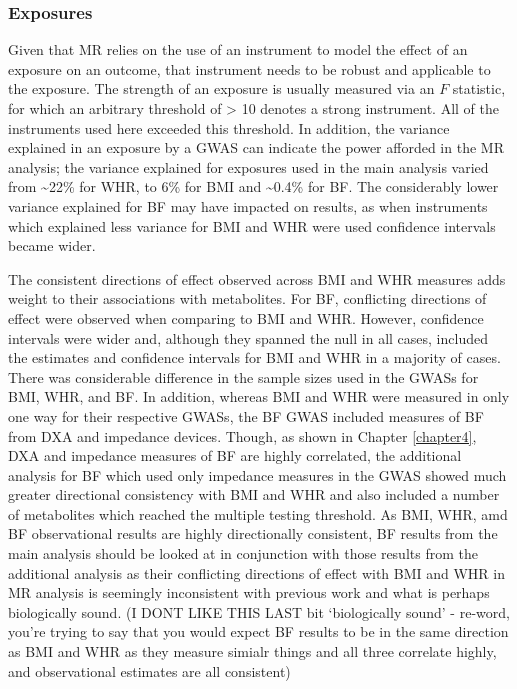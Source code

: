 \documentclass[11pt,twoside]{bristolthesis}
\begin{document}
\hypertarget{exposures}{%
\subsubsection{Exposures}\label{exposures}}

Given that MR relies on the use of an instrument to model the effect of an exposure on an outcome, that instrument needs to be robust and applicable to the exposure. The strength of an exposure is usually measured via an \(F\) statistic, for which an arbitrary threshold of \textgreater{} 10 denotes a strong instrument. All of the instruments used here exceeded this threshold. In addition, the variance explained in an exposure by a GWAS can indicate the power afforded in the MR analysis; the variance explained for exposures used in the main analysis varied from \textasciitilde{}22\% for WHR, to 6\% for BMI and \textasciitilde{}0.4\% for BF. The considerably lower variance explained for BF may have impacted on results, as when instruments which explained less variance for BMI and WHR were used confidence intervals became wider.

The consistent directions of effect observed across BMI and WHR measures adds weight to their associations with metabolites. For BF, conflicting directions of effect were observed when comparing to BMI and WHR. However, confidence intervals were wider and, although they spanned the null in all cases, included the estimates and confidence intervals for BMI and WHR in a majority of cases. There was considerable difference in the sample sizes used in the GWASs for BMI, WHR, and BF. In addition, whereas BMI and WHR were measured in only one way for their respective GWASs, the BF GWAS included measures of BF from DXA and impedance devices. Though, as shown in Chapter \ref{chapter4}, DXA and impedance measures of BF are highly correlated, the additional analysis for BF which used only impedance measures in the GWAS showed much greater directional consistency with BMI and WHR and also included a number of metabolites which reached the multiple testing threshold. As BMI, WHR, amd BF observational results are highly directionally consistent, BF results from the main analysis should be looked at in conjunction with those results from the additional analysis as their conflicting directions of effect with BMI and WHR in MR analysis is seemingly inconsistent with previous work and what is perhaps biologically sound. (I DONT LIKE THIS LAST bit `biologically sound' - re-word, you're trying to say that you would expect BF results to be in the same direction as BMI and WHR as they measure simialr things and all three correlate highly, and observational estimates are all consistent)
\end{document}
